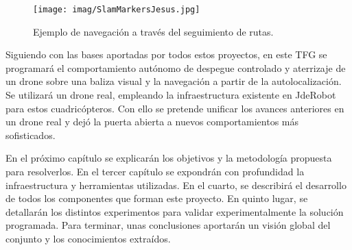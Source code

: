 \begin{figure}[hbtp]
	\centering
	\texttt{[image: imag/SlamMarkersJesus.jpg]}
	\caption{Ejemplo de navegación a través del seguimiento de rutas.}	
	\label{FIG:ejemplonavegacion}
\end{figure}



Siguiendo con las bases aportadas por todos estos proyectos, en este TFG se programará el comportamiento autónomo de despegue controlado y aterrizaje de un drone sobre una baliza visual y la navegación a partir de la autolocalización. Se utilizará un drone real, empleando la infraestructura existente en JdeRobot para estos cuadricópteros. Con ello se pretende unificar los avances anteriores en un drone real y dejó la puerta abierta a nuevos comportamientos más sofisticados.


En el próximo capítulo se explicarán los objetivos y la metodología propuesta para resolverlos. En el tercer capítulo se expondrán con profundidad la infraestructura y herramientas  utilizadas. En el cuarto, se describirá el desarrollo de todos los componentes que forman este proyecto. En quinto lugar, se detallarán los distintos experimentos para validar experimentalmente la solución programada. Para terminar, unas conclusiones aportarán un visión global del conjunto y los conocimientos extraídos.

